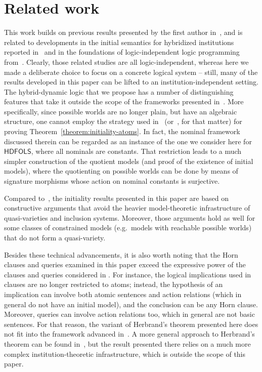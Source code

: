 \documentclass[a4paper,UKenglish,cleveref, autoref]{lipics-v2019}
\newcommand{\HDFOLS}{{\mathsf{HDFOLS}}}
\begin{document}

\section{Related work}
\label{section:related-work}

This work builds on previous results presented by the first author in~\cite{Gaina17Her}, and is related to developments in the initial semantics for hybridized institutions reported in~\cite{Diaconescu16} and in the foundations of logic-independent logic programming from~\cite{Diaconescu04,TutuF15,TutuF17}.
Clearly, those related studies are all logic-independent, whereas here we made a deliberate choice to focus on a concrete logical system -- still, many of the results developed in this paper can be lifted to an institution-independent setting.
The hybrid-dynamic logic that we propose has a number of distinguishing features that take it outside the scope of the frameworks presented in~\cite{Gaina17Her,Diaconescu16,Diaconescu04}.
More specifically, since possible worlds are no longer plain, but have an algebraic structure, one cannot employ the strategy used in~\cite{Gaina17Her} (or~\cite{Diaconescu16}, for that matter) for proving Theorem~\ref{theorem:initiality-atoms}.
In fact, the nominal framework discussed therein can be regarded as an instance of the one we consider here for \(\HDFOLS\), where all nominals are constants.
That restriction leads to a much simpler construction of the quotient models (and proof of the existence of initial models), where the quotienting on possible worlds can be done by means of signature morphisms whose action on nominal constants is surjective.

Compared to~\cite{Diaconescu16}, the initiality results presented in this paper are based on constructive arguments that avoid the heavier model-theoretic infrastructure of quasi-varieties and inclusion systems.
Moreover, those arguments hold as well for some classes of constrained models (e.g.\ models with reachable possible worlds) that do not form a quasi-variety.

Besides these technical advancements, it is also worth noting that the Horn clauses and queries examined in this paper exceed the expressive power of the clauses and queries considered in \cite{Gaina17Her}.
For instance, the logical implications used in clauses are no longer restricted to atoms; instead, the hypothesis of an implication can involve both atomic sentences and action relations (which in general do not have an initial model), and the conclusion can be any Horn clause.
Moreover, queries can involve action relations too, which in general are not basic sentences.
For that reason, the variant of Herbrand's theorem presented here does not fit into the framework advanced in~\cite{Diaconescu04}.
A more general approach to Herbrand's theorem can be found in~\cite{TutuF17}, but the result presented there relies on a much more complex institution-theoretic infrastructure, which is outside the scope of this paper.
\end{document}
